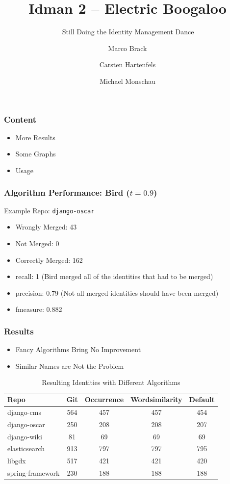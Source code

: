 \documentclass[slidestop,usenames,dvipsnames]{beamer}
\title{Idman 2 -- Electric Boogaloo}
\subtitle{💃\ Still Doing the Identity Management Dance 💃}
\author{Marco Brack \and Carsten Hartenfels \and Michael Monschau}
\newcounter{FrameCounter}
\newcommand{\nextframe}[0]{\stepcounter{FrameCounter}}
\newcommand{\gitem}{\vfill\item}
\begin{document}
\begin{frame}
    \titlepage
\end{frame}




\begin{frame}
    \frametitle{Content}
    \begin{itemize}
       \gitem More Results
       \gitem Some Graphs
       \gitem Usage
    \end{itemize}
    \vfill
\end{frame}


\begin{frame}
  \frametitle{Algorithm Performance: Bird ($t=0.9$)}
  Example Repo: \texttt{django-oscar}
  \begin{itemize}
    \gitem Wrongly Merged: 43
    \gitem Not Merged: 0
    \gitem Correctly Merged: 162
  \end{itemize}
  \begin{itemize}
    \gitem recall: 1 (Bird merged all of the identities that had to be merged)
    \gitem precision: 0.79 (Not all merged identities should have been merged)
    \gitem fmeasure: 0.882
  \end{itemize}
  \vfill
\end{frame}


\nextframe
\begin{frame}
  \frametitle{Results}
  \begin{itemize}
    \gitem Fancy Algorithms Bring No Improvement
    \gitem Similar Names are Not the Problem
  \end{itemize}
  \begin{table}[]
    \centering
    \caption{Resulting Identities with Different Algorithms}
    \label{tab:results}
    \begin{tabular}{|l|c|c|c|c|}
      \hline
      \textbf{Repo} & \textbf{Git} & \textbf{Occurrence} & \textbf{Wordsimilarity} & \textbf{Default}\\\hline
      django-cms & 564 & 457 & 457 & 454\\\hline
      django-oscar & 250 & 208 & 208 & 207\\\hline
      django-wiki & 81 & 69 & 69 & 69\\\hline
      elasticsearch & 913 & 797 & 797 & 795\\\hline
      libgdx & 517 & 421 & 421 & 420\\\hline
      spring-framework & 230 & 188 & 188 & 188\\\hline
    \end{tabular}
  \end{table}
  \vfill
\end{frame}
\end{document}

